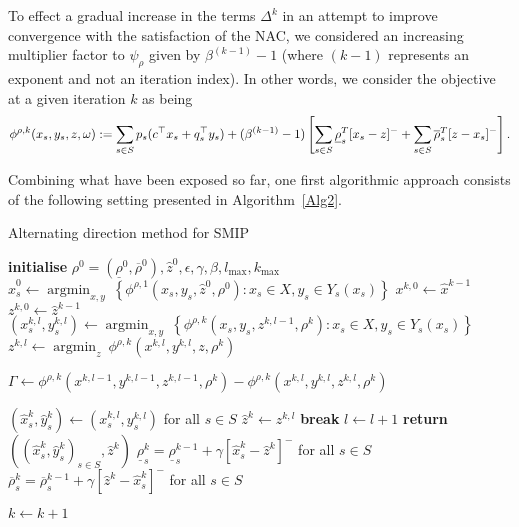 \documentclass[preprint, 1p, review]{elsarticle}
\newcommand{\braces}[1]{\left\{ #1 \right \}}
\DeclareMathOperator*{\argmin}{argmin}
\begin{document}
To effect a gradual increase in the terms $\Delta^k$ in an attempt to improve convergence with the satisfaction of the NAC, we considered an increasing multiplier factor to $\psi_\rho$ given by $\beta^{(k-1)}-1$ (where $(k-1)$ represents an exponent and not an iteration index). In other words, we consider the objective
at a given iteration $k$ as being 
$$\phi^{\rho,k}(x_s,y_s,z,\omega):=\sum_{s \in S}p_s(c^\top x_s + q_s^\top y_s) + (\beta^{(k-1)}-1)\left[\sum_{s \in S}\underline{\rho}_s^T[x_s - z]^- +  \sum_{s \in S}\overline{\rho}_s^T[z - x_s]^-\right] \\ .$$ 


Combining what have been exposed so far, one first algorithmic approach consists of the following setting presented in Algorithm~\ref{Alg2}.
%
\begin{algorithm}[H]
\caption{Alternating direction method for SMIP}\label{Alg2}
\begin{algorithmic}[1] %
\State \textbf{initialise} $\rho^0=(\underline{\rho}^0, \overline{\rho}^0), \hat{z}^{0}, 
\epsilon, \gamma, \beta, l_{\text{max}}, k_{\text{max}}$
    \State $\hat{x}^0_s \gets \argmin_{x,y} \ \braces{\phi^{\rho,1}    (x_s,y_s,\hat{z}^{0},\rho^0) : x_s \in X, y_s \in Y_s(x_s)}$ \label{Alg2:Line3}
\EndFor
{}
    \State $x^{k,0} \gets \hat{x}^{k-1}$
    \State $z^{k,0} \gets \hat{z}^{k-1}$
           \State $(x_s^{k,l},y_s^{k,l}) \gets \argmin_{x,y} \ \braces{\phi^{\rho,k}(x_s,y_s,z^{k,l-1},\rho^k) : x_s \in X, y_s \in Y_s(x_s)}$
        \EndFor     
        \State $z^{k,l} \gets \argmin_{z} \ \phi^{\rho,k}(x^{k,l},y^{k,l},z,\rho^k)$ \label{zUpdate}
            
          \State $\Gamma \gets \phi^{\rho,k}(x^{k,l-1},y^{k,l-1},z^{k,l-1},\rho^k) - \phi^{\rho,k}(x^{k,l},y^{k,l},z^{k,l},\rho^k)$
        
            \State $(\hat{x}_s^{k},\hat{y}_s^{k}) \gets (x_s^{k,l},y_s^{k,l})$ for all $s \in S$
            \State $\hat{z}^{k} \gets z^{k,l}$
            \State \textbf{break} 
        \EndIf
        \State $l \gets l + 1$ 
    \EndFor
        \State \textbf{return } $((\hat{x}_s^k, \hat{y}_s^k)_{s\in S}, \hat{z}^k)$    
    \Else \quad %
        \State $\underline{\rho}_s^{k} = \underline{\rho}_s^{k-1} + \gamma [\hat{x}_s^{k} - \hat{z}^{k}]^-$ for all $s \in S$
        \State $\overline{\rho}_s^{k} = \overline{\rho}_s^{k-1} + \gamma [\hat{z}^{k} - \hat{x}_s^{k}]^-$ for all $s \in S$
        
    \EndIf
    \State $k \gets k + 1$
\EndFor
\end{algorithmic}
\end{algorithm}
\end{document}

